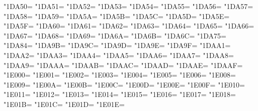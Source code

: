 \XeTeXcharclass"1DA50=\KclassNum
\XeTeXcharclass"1DA51=\KclassNum
\XeTeXcharclass"1DA52=\KclassNum
\XeTeXcharclass"1DA53=\KclassNum
\XeTeXcharclass"1DA54=\KclassNum
\XeTeXcharclass"1DA55=\KclassNum
\XeTeXcharclass"1DA56=\KclassNum
\XeTeXcharclass"1DA57=\KclassNum
\XeTeXcharclass"1DA58=\KclassNum
\XeTeXcharclass"1DA59=\KclassNum
\XeTeXcharclass"1DA5A=\KclassNum
\XeTeXcharclass"1DA5B=\KclassNum
\XeTeXcharclass"1DA5C=\KclassNum
\XeTeXcharclass"1DA5D=\KclassNum
\XeTeXcharclass"1DA5E=\KclassNum
\XeTeXcharclass"1DA5F=\KclassNum
\XeTeXcharclass"1DA60=\KclassNum
\XeTeXcharclass"1DA61=\KclassNum
\XeTeXcharclass"1DA62=\KclassNum
\XeTeXcharclass"1DA63=\KclassNum
\XeTeXcharclass"1DA64=\KclassNum
\XeTeXcharclass"1DA65=\KclassNum
\XeTeXcharclass"1DA66=\KclassNum
\XeTeXcharclass"1DA67=\KclassNum
\XeTeXcharclass"1DA68=\KclassNum
\XeTeXcharclass"1DA69=\KclassNum
\XeTeXcharclass"1DA6A=\KclassNum
\XeTeXcharclass"1DA6B=\KclassNum
\XeTeXcharclass"1DA6C=\KclassNum
\XeTeXcharclass"1DA75=\KclassNum
\XeTeXcharclass"1DA84=\KclassNum
\XeTeXcharclass"1DA9B=\KclassNum
\XeTeXcharclass"1DA9C=\KclassNum
\XeTeXcharclass"1DA9D=\KclassNum
\XeTeXcharclass"1DA9E=\KclassNum
\XeTeXcharclass"1DA9F=\KclassNum
\XeTeXcharclass"1DAA1=\KclassNum
\XeTeXcharclass"1DAA2=\KclassNum
\XeTeXcharclass"1DAA3=\KclassNum
\XeTeXcharclass"1DAA4=\KclassNum
\XeTeXcharclass"1DAA5=\KclassNum
\XeTeXcharclass"1DAA6=\KclassNum
\XeTeXcharclass"1DAA7=\KclassNum
\XeTeXcharclass"1DAA8=\KclassNum
\XeTeXcharclass"1DAA9=\KclassNum
\XeTeXcharclass"1DAAA=\KclassNum
\XeTeXcharclass"1DAAB=\KclassNum
\XeTeXcharclass"1DAAC=\KclassNum
\XeTeXcharclass"1DAAD=\KclassNum
\XeTeXcharclass"1DAAE=\KclassNum
\XeTeXcharclass"1DAAF=\KclassNum
\XeTeXcharclass"1E000=\KclassNum
\XeTeXcharclass"1E001=\KclassNum
\XeTeXcharclass"1E002=\KclassNum
\XeTeXcharclass"1E003=\KclassNum
\XeTeXcharclass"1E004=\KclassNum
\XeTeXcharclass"1E005=\KclassNum
\XeTeXcharclass"1E006=\KclassNum
\XeTeXcharclass"1E008=\KclassNum
\XeTeXcharclass"1E009=\KclassNum
\XeTeXcharclass"1E00A=\KclassNum
\XeTeXcharclass"1E00B=\KclassNum
\XeTeXcharclass"1E00C=\KclassNum
\XeTeXcharclass"1E00D=\KclassNum
\XeTeXcharclass"1E00E=\KclassNum
\XeTeXcharclass"1E00F=\KclassNum
\XeTeXcharclass"1E010=\KclassNum
\XeTeXcharclass"1E011=\KclassNum
\XeTeXcharclass"1E012=\KclassNum
\XeTeXcharclass"1E013=\KclassNum
\XeTeXcharclass"1E014=\KclassNum
\XeTeXcharclass"1E015=\KclassNum
\XeTeXcharclass"1E016=\KclassNum
\XeTeXcharclass"1E017=\KclassNum
\XeTeXcharclass"1E018=\KclassNum
\XeTeXcharclass"1E01B=\KclassNum
\XeTeXcharclass"1E01C=\KclassNum
\XeTeXcharclass"1E01D=\KclassNum
\XeTeXcharclass"1E01E=\KclassNum
